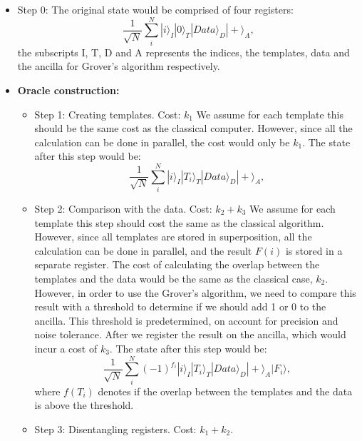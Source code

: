 \documentclass[aps,prd,nofootinbib,twocolumn,reprint,superscriptaddress,showpacs,showkeys,longbibliography]{revtex4-1}
\newcommand{\ket}[1]{|#1\rangle}
\begin{document}
\begin{itemize}
    \item Step 0: The original state would be comprised of four registers:
        \begin{equation}
            \label{step0}
            \frac{1}{\sqrt{N}}\sum^N_i\ket{i}_I\ket{0}_T\ket{Data}_D\ket{+}_A,
        \end{equation}
        the subscripts I, T, D and A represents the indices, the templates, data and the ancilla for Grover's algorithm respectively. 
    \item  \textbf{Oracle construction:} 
        \begin{itemize}
             \item Step 1: Creating templates. Cost: $k_1$
               \newline We assume for each template this should be the same cost as the classical computer. However, since all the calculation can be done in parallel, the cost would only be $k_1$. The state after this step would be:
                \begin{equation}
                \label{step1}
                \frac{1}{\sqrt{N}}\sum^N_i\ket{i}_I\ket{T_i}_T\ket{Data}_D\ket{+}_A,
                \end{equation}
            \item Step 2: Comparison with the data. Cost: $k_2+k_3$
             \newline We assume for each template this step should cost the same as the classical algorithm. However, since all templates are stored in superposition, all the calculation can be done in parallel, and the result $F(i)$ is stored in a separate register. The cost of calculating the overlap between the templates and the data would be the same as the classical case, $k_2$. However, in order to use the Grover's algorithm, we need to compare this result with a threshold to determine if we should add 1 or 0 to the ancilla. This threshold is predetermined, on account for precision and noise tolerance. After we register the result on the ancilla, which would incur a cost of $k_3$. The state after this step would be: 
            \begin{equation}
                \label{step2}
                \frac{1}{\sqrt{N}}\sum^N_i(-1)^{f_i}\ket{i}_I\ket{T_i}_T\ket{Data}_D\ket{+}_A\ket{F_i},
            \end{equation}
            where $f(T_i)$ denotes if the overlap between the templates and the data is above the threshold.
            \item Step 3: Disentangling registers. Cost: $k_1+k_2$.

\end{itemize}
\end{itemize}
\end{document}
